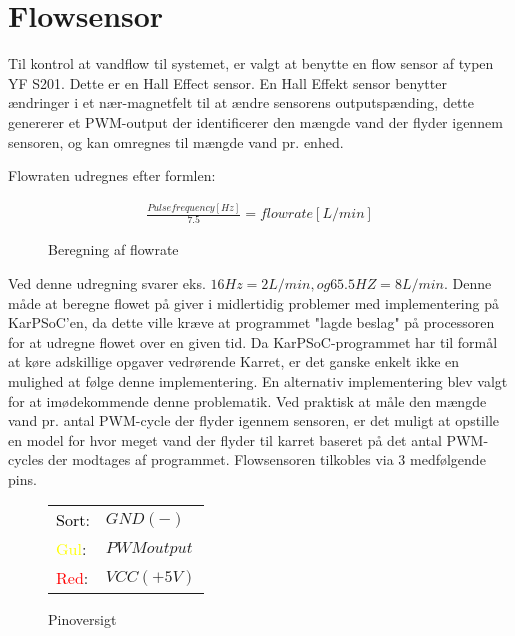 
\section{Flowsensor}
Til kontrol at vandflow til systemet, er valgt at benytte en flow sensor af typen YF S201. 
Dette er en Hall Effect sensor. En Hall Effekt sensor benytter ændringer i et nær-magnetfelt til at 
ændre sensorens outputspænding, dette genererer et PWM-output der identificerer den mængde vand 
der flyder igennem sensoren, og kan omregnes til mængde vand pr. enhed.

Flowraten udregnes efter formlen: 
				
\begin{figure}[H]
    \begin{align*}
       \frac{Pulse frequency [Hz]}{7.5} = flowrate[L/min]
    \end{align*}
\label{eq:PWM}
\caption{Beregning af flowrate}
\end{figure}				

Ved denne udregning svarer eks. $16Hz = 2L/min, og 65.5HZ = 8L/min$. \newline
Denne måde at beregne flowet på giver i midlertidig problemer med implementering på KarPSoC'en, da dette ville kræve at programmet "lagde beslag" på processoren for at udregne flowet over en given tid. Da KarPSoC-programmet har til formål at køre adskillige opgaver vedrørende Karret, er det ganske enkelt ikke en mulighed at følge denne implementering.\newline
En alternativ implementering blev valgt for at imødekommende denne problematik. Ved praktisk at måle den mængde vand pr. antal PWM-cycle der flyder igennem sensoren, er det muligt at opstille en model for hvor meget vand der flyder til karret baseret på det antal PWM-cycles der modtages af programmet.\newline
Flowsensoren tilkobles via 3 medfølgende pins.

\begin{figure}[H]
	\begin{center}
		\begin{tabular}{ l l }
			 \textcolor{black}{Sort}:   & $GND(-)$ 		\\ 
			 \textcolor{yellow}{Gul}:   & $PWM output$ 	\\  
			 \textcolor{red}{Red}:    	& $VCC(+5V)$ 	\\
		\end{tabular}
	\end{center}
\caption{Pinoversigt}
\end{figure}

